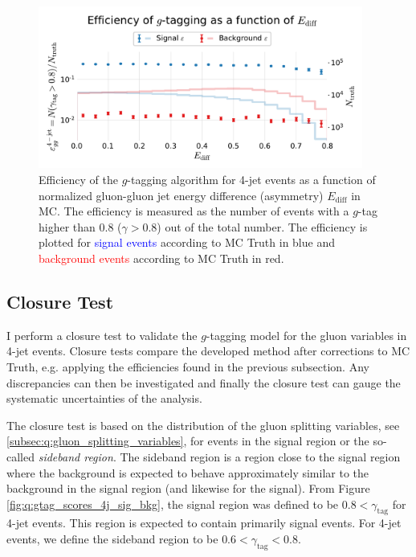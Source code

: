 \begin{figure}
  \centerfloat
  \includegraphics[width=0.95\textwidth, trim=10 10 10 45, clip, page=1]{figures/quarks/efficiency_events-down_sample=1.00-ML_vars=vertex-selection=b-ejet_min=4-n_iter_RS_lgb=99-n_iter_RS_xgb=9-cdot_cut=0.90-version=19-njet=4.pdf}
  \caption[$g$-Tagging Efficiency for 4-Jet Events in MC as a Function of the Normalized Gluon-Gluon Jet Energy Difference Asymmetry $E_\mathrm{diff}$]
          {Efficiency of the $g$-tagging algorithm for 4-jet events as a function of normalized gluon-gluon jet energy difference (asymmetry) $E_\mathrm{diff}$  in MC. The efficiency is measured as the number of events with a $g$-tag higher than 0.8 ($\gamma > 0.8$) out of the total number. The efficiency is plotted for \textcolor{blue}{signal events} according to MC Truth in blue and \textcolor{red}{background events} according to MC Truth in red.
          } 
  \label{fig:q:effiency_gtag_E_diff_non_appendix}
\end{figure}


\subsection{Closure Test}
\label{subsec:q:gluon_splitting_closure}

I perform a closure test to validate the $g$-tagging model for the gluon variables in 4-jet events. Closure tests compare the developed method after corrections to MC Truth, e.g. applying the efficiencies found in the previous subsection. Any discrepancies can then be investigated and finally the closure test can gauge the systematic uncertainties of the analysis. 

The closure test is based on the distribution of the gluon splitting variables, see \autoref{subsec:q:gluon_splitting_variables}, for events in the signal region or the so-called \emph{sideband region}. The sideband region is a region close to the signal region where the background is expected to behave approximately similar to the background in the signal region (and likewise for the signal). From Figure \ref{fig:q:gtag_scores_4j_sig_bkg}, the signal region was defined to be $0.8 < \gamma_\mathrm{tag}$ for 4-jet events. This region is expected to contain primarily signal events. For 4-jet events, we define the sideband region to be $0.6 < \gamma_\mathrm{tag} < 0.8$. 

